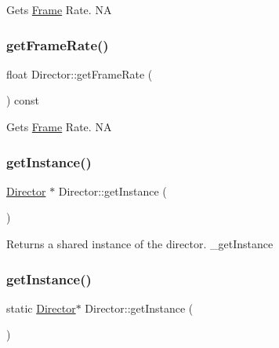 Gets \hyperlink{classFrame}{Frame} Rate.  NA \mbox{\label{classDirector_adb86cf6aa40949fd1d43ef8f837062e8}} 
\subsubsection{\texorpdfstring{get\+Frame\+Rate()}{getFrameRate()}\hspace{0.1cm}{\footnotesize\ttfamily [2/2]}}
{\footnotesize\ttfamily float Director\+::get\+Frame\+Rate (\begin{DoxyParamCaption}{ }\end{DoxyParamCaption}) const\hspace{0.3cm}{\ttfamily [inline]}}

Gets \hyperlink{classFrame}{Frame} Rate.  NA \mbox{\label{classDirector_a8d2a4ca9e20cd400ddadd516efa111e0}} 
\subsubsection{\texorpdfstring{get\+Instance()}{getInstance()}\hspace{0.1cm}{\footnotesize\ttfamily [1/2]}}
{\footnotesize\ttfamily \hyperlink{classDirector}{Director} $\ast$ Director\+::get\+Instance (\begin{DoxyParamCaption}{ }\end{DoxyParamCaption})\hspace{0.3cm}{\ttfamily [static]}}

Returns a shared instance of the director.  \+\_\+get\+Instance \mbox{\label{classDirector_a59a83fa0c2e9d0f70ca7f4a13f2dd341}} 
\subsubsection{\texorpdfstring{get\+Instance()}{getInstance()}\hspace{0.1cm}{\footnotesize\ttfamily [2/2]}}
{\footnotesize\ttfamily static \hyperlink{classDirector}{Director}$\ast$ Director\+::get\+Instance (\begin{DoxyParamCaption}{ }\end{DoxyParamCaption})\hspace{0.3cm}{\ttfamily [static]}}

